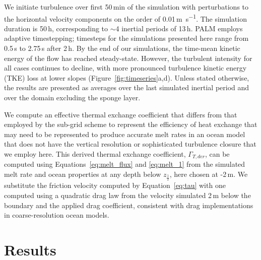 \documentclass[tc, manuscript]{copernicus}
\begin{document}
We initiate turbulence over first 50\,min of the simulation with perturbations to the horizontal velocity components on the order of 0.01\,\unit{m s^{-1}}. The simulation duration is 50\,\unit{h}, corresponding to $\sim$4 inertial periods of 13\,\unit{h}. PALM employs adaptive timestepping; timesteps for the simulations presented here range from 0.5\,s to 2.75\,s after 2\,\unit{h}. By the end of our simulations, the time-mean kinetic energy of the flow has reached steady-state. However, the turbulent intensity for all cases continues to decline, with more pronounced turbulence kinetic energy (TKE) loss at lower slopes (Figure~\ref{fig:timeseries}a,d). Unless stated otherwise, the results are presented as averages over the last simulated inertial period and over the domain excluding the sponge layer.

We compute an effective thermal exchange coefficient that differs from that employed by the sub-grid scheme to represent the efficiency of heat exchange that may need to be represented to produce accurate melt rates in an ocean model that does not have the vertical resolution or sophisticated turbulence closure that we employ here. This derived thermal exchange coefficient, $\Gamma_{T,der}$, can be computed using Equations~\ref{eq:melt_flux} and \ref{eq:melt_1} from the simulated melt rate and ocean properties at any depth below $z_{\frac{1}{2}}$, here chosen at -2\,\unit{m}. We substitute the friction velocity computed by Equation~\ref{eq:tau} with one computed using a quadratic drag law from the velocity simulated 2\,\unit{m} below the boundary and the applied drag coefficient, consistent with drag implementations in coarse-resolution ocean models. 


\section{Results}\label{results}
\end{document}
